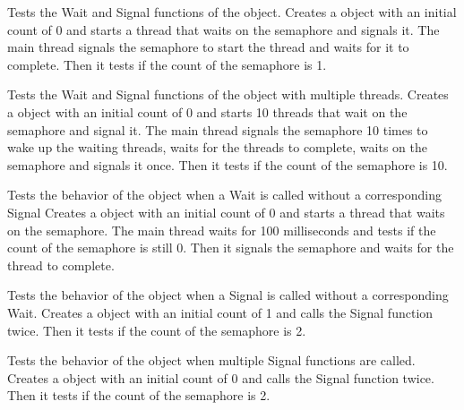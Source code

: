 \begin{DoxyRefList}
%
Tests the Wait and Signal functions of the  object. Creates a  object with an initial count of 0 and starts a thread that waits on the semaphore and signals it. The main thread signals the semaphore to start the thread and waits for it to complete. Then it tests if the count of the semaphore is 1.  
\item[Member \doxylink{semaphore_8test_8cc_a839989411f5a2147cd64bdba9fa27905}{TEST} (Semaphore\+Test, Multiple\+Wait\+Signal)]\label{test__test000011}%
%
Tests the Wait and Signal functions of the  object with multiple threads. Creates a  object with an initial count of 0 and starts 10 threads that wait on the semaphore and signal it. The main thread signals the semaphore 10 times to wake up the waiting threads, waits for the threads to complete, waits on the semaphore and signals it once. Then it tests if the count of the semaphore is 10.  
\item[Member \doxylink{semaphore_8test_8cc_a649c78316d8d2c3dc73d84ce5d5f712b}{TEST} (Semaphore\+Test, Wait\+Without\+Signal)]\label{test__test000012}%
%
Tests the behavior of the  object when a Wait is called without a corresponding Signal Creates a  object with an initial count of 0 and starts a thread that waits on the semaphore. The main thread waits for 100 milliseconds and tests if the count of the semaphore is still 0. Then it signals the semaphore and waits for the thread to complete.  
\item[Member \doxylink{semaphore_8test_8cc_aed489802850a894442116035cc6fd450}{TEST} (Semaphore\+Test, Signal\+Without\+Wait)]\label{test__test000013}%
%
Tests the behavior of the  object when a Signal is called without a corresponding Wait. Creates a  object with an initial count of 1 and calls the Signal function twice. Then it tests if the count of the semaphore is 2.  
\item[Member \doxylink{semaphore_8test_8cc_a4d28b210dd621384af9d457f3399b68c}{TEST} (Semaphore\+Test, Multiple\+Signal)]\label{test__test000014}%
%
Tests the behavior of the  object when multiple Signal functions are called. Creates a  object with an initial count of 0 and calls the Signal function twice. Then it tests if the count of the semaphore is 2. 
\end{DoxyRefList}